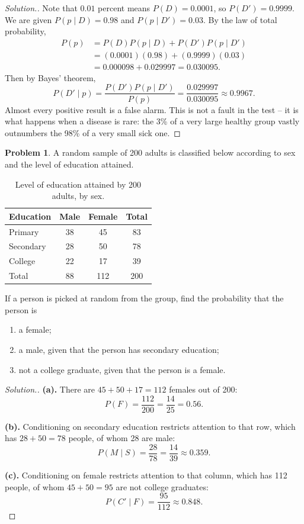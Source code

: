\documentclass[12pt,a4paper]{report}
\theoremstyle{definition}
\theoremstyle{plain}
\theoremstyle{definition}
\newtheorem{problemx}{Problem}[section]
\newenvironment{problem}{\begin{problemx}}{\end{problemx}}
\newenvironment{solution}
  {\renewcommand{\qedsymbol}{}\begin{proof}[\textit{Solution}.]}
  {\end{proof}}
\begin{document}
\begin{solution}
Note that $0.01$ percent means $P(D)=0.0001$, so $P(D')=0.9999$. We are given
$P(p\mid D)=0.98$ and $P(p\mid D')=0.03$. By the law of total probability,
\begin{align*}
P(p) &= P(D)P(p\mid D)+P(D')P(p\mid D')\\
     &= (0.0001)(0.98)+(0.9999)(0.03)\\
     &= 0.000098+0.029997 = 0.030095.
\end{align*}
Then by Bayes' theorem,
\[P(D'\mid p) = \frac{P(D')P(p\mid D')}{P(p)} = \frac{0.029997}{0.030095} \approx 0.9967.\]
Almost every positive result is a false alarm. This is not a fault in the test -- it is
what happens when a disease is rare: the 3\% of a very large healthy group vastly
outnumbers the 98\% of a very small sick one.
\end{solution}

\begin{problem}
A random sample of 200 adults is classified below according to sex and the level of
education attained.
\begin{table}[H]
\centering
\begin{tabular}{lccc}
Education & Male & Female & Total\\
\hline
Primary   & 38 & 45 & 83\\
Secondary & 28 & 50 & 78\\
College   & 22 & 17 & 39\\
\hline
Total     & 88 & 112 & 200\\
\end{tabular}
\caption{Level of education attained by 200 adults, by sex.}
\end{table}
If a person is picked at random from the group, find the probability that the person is
\begin{enumerate}
\item[(a).] a female;
\item[(b).] a male, given that the person has secondary education;
\item[(c).] not a college graduate, given that the person is a female.
\end{enumerate}
\end{problem}

\begin{solution}
\textbf{(a).} There are $45+50+17 = 112$ females out of 200:
\[P(F) = \frac{112}{200} = \frac{14}{25} = 0.56.\]

\textbf{(b).} Conditioning on secondary education restricts attention to that row, which
has $28+50=78$ people, of whom 28 are male:
\[P(M\mid S) = \frac{28}{78} = \frac{14}{39} \approx 0.359.\]

\textbf{(c).} Conditioning on female restricts attention to that column, which has 112
people, of whom $45+50=95$ are not college graduates:
\[P(C'\mid F) = \frac{95}{112} \approx 0.848.\]
\end{solution}
\end{document}

